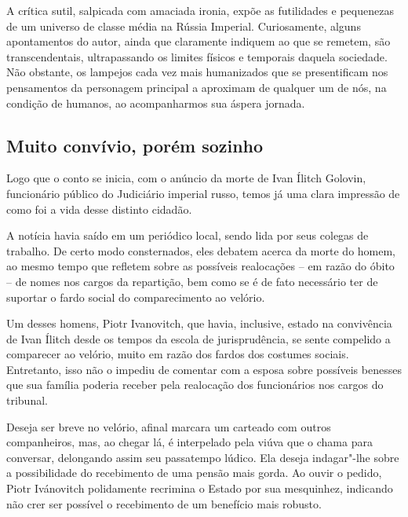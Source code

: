 \documentclass[12pt]{extarticle}
\begin{document}


A crítica sutil, salpicada com amaciada ironia, expõe as futilidades e
pequenezas de um universo de classe média na Rússia Imperial.
Curiosamente, alguns apontamentos do autor, ainda que claramente
indiquem ao que se remetem, são transcendentais, ultrapassando os limites
físicos e temporais daquela sociedade. Não obstante, os lampejos cada
vez mais humanizados que se presentificam nos pensamentos da personagem
principal a aproximam de qualquer um de nós, na condição de humanos, ao
acompanharmos sua áspera jornada.

\subsection{Muito convívio, porém sozinho}

Logo que o conto se inicia, com o anúncio da morte de Ivan Ílitch
Golovin, funcionário público do Judiciário imperial russo, temos já
uma clara impressão de como foi a vida desse distinto cidadão.

A notícia havia saído em um periódico local, sendo lida por seus colegas de
trabalho. De certo modo consternados, eles debatem acerca da morte do
homem, ao mesmo tempo que refletem sobre as possíveis realocações -- em
razão do óbito -- de nomes nos cargos da repartição, bem como se é de
fato necessário ter de suportar o fardo social do comparecimento ao
velório.

Um desses homens, Piotr Ivanovitch, que havia, inclusive, estado na
convivência de Ivan Ílitch desde os tempos da escola de jurisprudência,
se sente compelido a comparecer ao velório, muito em razão dos fardos
dos costumes sociais. Entretanto, isso não o impediu de comentar com a
esposa sobre possíveis benesses que sua família poderia receber pela
realocação dos funcionários nos cargos do tribunal.

Deseja ser breve no velório, afinal marcara um carteado com outros
companheiros, mas, ao chegar lá, é interpelado pela viúva que o chama
para conversar, delongando assim seu passatempo lúdico. Ela deseja
indagar"-lhe sobre a possibilidade do recebimento de uma pensão mais
gorda. Ao ouvir o pedido, Piotr Ivánovitch polidamente recrimina o
Estado por sua mesquinhez, indicando não crer ser possível o recebimento
de um benefício mais robusto.

\end{document}
